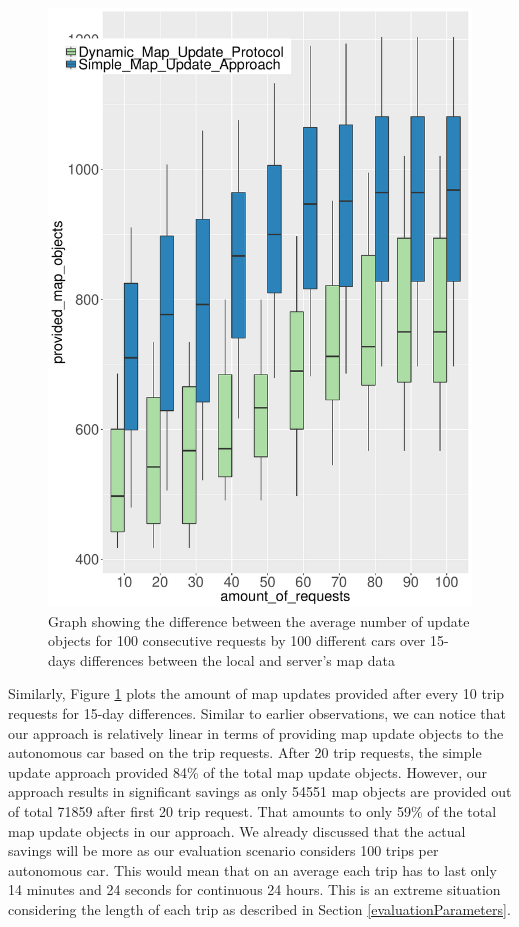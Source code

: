 \begin{figure}
\centering
\includegraphics[scale=.7]{TTest15DayP.pdf}
\caption{Graph showing the difference between the average number of update objects for 100 consecutive requests by 100 different cars over 15-days differences between the local and server's map data }
\label{fg:ber15d100}
\end{figure}

Similarly, Figure \ref{fg:ber15d100} plots the amount of map updates provided after every 10 trip requests for 15-day differences. Similar to earlier observations, we can notice that our approach is relatively linear in terms of providing map update objects to the autonomous car based on the trip requests. After 20 trip requests, the simple update approach provided 84\% of the total map update objects. However, our approach results in significant savings as only 54551 map objects are provided out of total 71859 after first 20 trip request. That amounts to only 59\% of the total map update objects in our approach. We already discussed that the actual savings will be more as our evaluation scenario considers 100 trips per autonomous car. This would mean that on an average each trip has to last only 14 minutes and 24 seconds for continuous 24 hours. This is an extreme situation considering the length of each trip as described in Section \ref{evaluationParameters}.  \\


